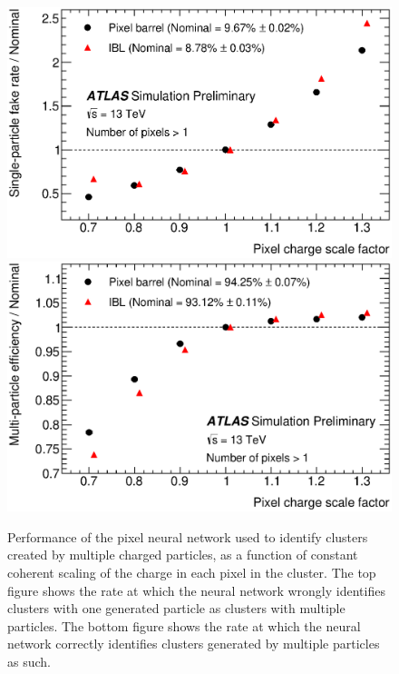 \begin{centering}
\begin{figure}[bth]
\myfloatalign
\includegraphics[width=.9\linewidth]{figures/nn/fig_05a.eps}
\includegraphics[width=.9\linewidth]{figures/nn/fig_05b.eps}
\caption{Performance of the pixel neural network used to identify clusters created by multiple charged particles, as a function of constant coherent scaling of the charge in each pixel in the cluster. The top figure shows the rate at which the neural network wrongly identifies clusters with one generated particle as clusters with multiple particles. The bottom figure shows the rate at which the neural network correctly identifies clusters generated by multiple particles as such.}
\label{fig:13tev_charge_robustness}
\end{figure}
\end{centering}

